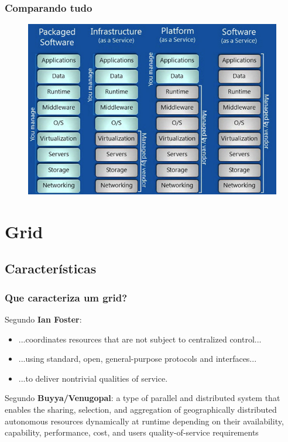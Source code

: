 \documentclass[10pt]{beamer}
\begin{document}
	\begin{frame}%
	\frametitle{Comparando tudo}
		\begin{figure}
		\centering
			\includegraphics[scale=0.4]{./figuras/iaas-paas-saas.jpg}
		\end{figure}
	\end{frame}

\section{Grid}
	\subsection{Características}

	\begin{frame}
	\frametitle{Que caracteriza um grid?}
		\begin{block}{Segundo \textbf{Ian Foster}:}
			\begin{itemize}
				\item ...coordinates resources that are not subject to centralized control...
				\item ...using standard, open, general-purpose protocols and interfaces...
				\item ...to deliver nontrivial qualities of service.
			\end{itemize}
		\end{block}
		\begin{block}{Segundo \textbf{Buyya/Venugopal}:}
		a type of parallel and distributed system that enables the sharing, selection, and aggregation of geographically distributed autonomous resources dynamically at runtime depending on their availability, capability, performance, cost, and users quality-of-service requirements
		\end{block}
	\end{frame}
\end{document}
